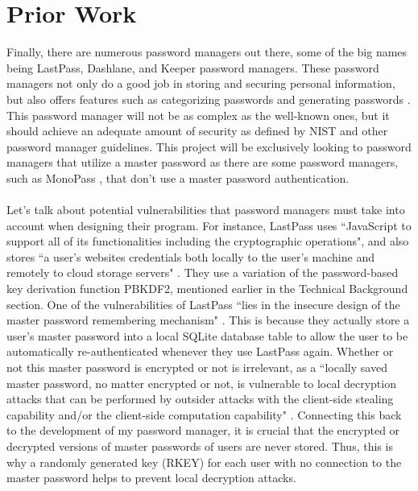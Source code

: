 \documentclass[10pt,twocolumn]{article}
\begin{document}
\section{Prior Work}
Finally, there are numerous password managers out there, some of the big names being LastPass, Dashlane, and Keeper password managers. These password managers not only do a good job in storing and securing personal information, but also offers features such as categorizing passwords and generating passwords \cite{alodhyani_theodorakopoulos_reinecke_2020}. This password manager will not be as complex as the well-known ones, but it should achieve an adequate amount of security as defined by NIST and other password manager guidelines. This project will be exclusively looking to password managers that utilize a master password as there are some password managers, such as MonoPass \cite{jeong_jung_2021}, that don't use a master password authentication.
\paragraph{}
Let's talk about potential vulnerabilities that password managers must take into account when designing their program. For instance, LastPass uses ``JavaScript to support all of its functionalities including the cryptographic operations", and also stores ``a user's websites credentials both locally to the user's machine and remotely to cloud storage servers" \cite{zhao2013security}. They use a variation of the password-based key derivation function PBKDF2, mentioned earlier in the Technical Background section. One of the vulnerabilities of LastPass ``lies in the insecure design of the master password remembering mechanism" \cite{zhao2013security}. This is because they actually store a user's master password into a local SQLite database table to allow the user to be automatically re-authenticated whenever they use LastPass again. Whether or not this master password is encrypted or not is irrelevant, as a ``locally saved master password, no matter encrypted or not, is vulnerable to local decryption attacks that can be performed by outsider attacks with the client-side stealing capability and/or the client-side computation capability" \cite{zhao2013security}. Connecting this back to the development of my password manager, it is crucial that the encrypted or decrypted versions of master passwords of users are never stored. Thus, this is why a randomly generated key (RKEY) for each user with no connection to the master password helps to prevent local decryption attacks.
\end{document}
